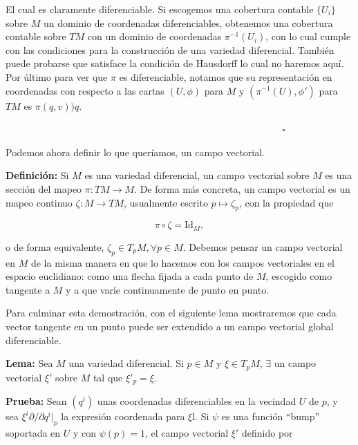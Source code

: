 \documentclass[a4paper,10pt]{article}
\numberwithin{equation}{section}
\newcommand{\definicion}{\textbf{Definición: }}
\newcommand{\lema}{\textbf{Lema: }}
\newcommand{\prueba}{\textbf{Prueba: }}
\begin{document}
El cual es claramente diferenciable. Si escogemos una cobertura contable 
$\{U_i\}$ sobre $M$ un dominio de coordenadas diferenciables, obtenemos 
una cobertura contable sobre $TM$ con un dominio de coordenadas ${\pi^{-1}(U_i)}$,
con lo cual cumple con las condiciones para la construcción de una variedad 
diferencial. También puede probarse que satisface la condición de Hausdorff 
lo cual no haremos aquí. Por último para ver que $\pi$ es diferenciable, 
notamos que su representación en coordenadas con respecto a las cartas 
$(U,\phi)$ para $M$ y $(\pi^{-1}(U),\phi')$ para $TM$ es $\pi(q,v))q$.

$\hspace{12cm} \square$

Podemos ahora definir lo que queríamos, un campo vectorial.

\vspace{.3cm}

\definicion Si $M$ es una variedad diferencial, un campo vectorial 
sobre $M$ es una sección del mapeo $\pi:TM \rightarrow M$. De forma 
más concreta, un campo vectorial es un mapeo continuo $\zeta:M \rightarrow TM$, 
usualmente escrito $p \mapsto \zeta_p$, con la propiedad que 

\begin{equation}
 \pi \circ \zeta = \text{Id}_M,
\end{equation}

o de forma equivalente, $\zeta_p \in T_p M, \forall p \in M$. Debemos pensar un 
campo vectorial en $M$ de la misma manera en que lo hacemos con los campos vectoriales 
en el espacio euclidiano: como una flecha fijada a cada punto de $M$, escogido como 
tangente a $M$ y a que varíe continuamente de punto en punto.

\vspace{.3cm}

Para culminar esta demostración, con el siguiente lema mostraremos que cada vector 
tangente en un punto puede ser extendido a un campo vectorial global diferenciable.

\vspace{.3cm}

\lema Sea $M$ una variedad diferencial. Si $p \in M$ y $\xi \in T_p M$, $\exists$ un 
campo vectorial $\xi'$ sobre $M$ tal que $\xi'_p = \xi$.

\vspace{.3cm}

\prueba Sean $(q^i)$ unas coordenadas diferenciables en la vecindad $U$ de $p$, y 
sea $\xi^i \partial/\partial q^i|_p$ la expresión coordenada para $\xi$l. Si $\psi$ 
es una función ``bump'' \cite{curtis} soportada en $U$ y con $\psi(p) = 1$, el 
campo vectorial $\xi'$ definido por 
\end{document}
